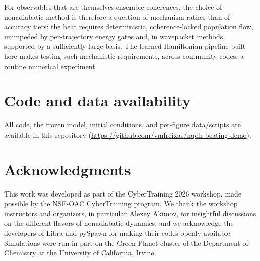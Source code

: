 \documentclass[11pt]{article}
\begin{document}
For observables that are themselves ensemble coherences, the choice of nonadiabatic method is therefore a question of mechanism rather than of accuracy tiers: the beat requires deterministic, coherence-locked population flow, unimpeded by per-trajectory energy gates and, in wavepacket methods, supported by a sufficiently large basis. The learned-Hamiltonian pipeline built here makes testing such mechanistic requirements, across community codes, a routine numerical experiment.

\section*{Code and data availability}
All code, the frozen model, initial conditions, and per-figure data/scripts
are available in this repository
(\url{https://github.com/vmfreixas/nqdh-beating-demo}).

\section*{Acknowledgments}
This work was developed as part of the CyberTraining 2026 workshop, made possible by the NSF-OAC CyberTraining program. We thank the workshop instructors and organizers, in particular Alexey Akimov, for insightful discussions on the different flavors of nonadiabatic dynamics, and we acknowledge the developers of Libra and pySpawn for making their codes openly available. Simulations were run in part on the Green Planet cluster of the Department of Chemistry at the University of California, Irvine.



\end{document}
